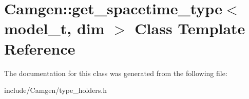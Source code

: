 \hypertarget{a00253}{}\section{Camgen\+:\+:get\+\_\+spacetime\+\_\+type$<$ model\+\_\+t, dim $>$ Class Template Reference}
\label{a00253}


The documentation for this class was generated from the following file\+:\begin{DoxyCompactItemize}
\item 
include/\+Camgen/type\+\_\+holders.\+h\end{DoxyCompactItemize}
